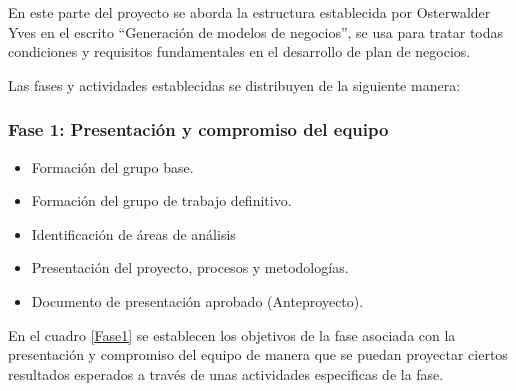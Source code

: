 En este parte del proyecto se aborda la estructura establecida por Osterwalder Yves en el escrito “Generación de modelos de negocios”\cite{modeloNegocio}, se usa para tratar todas condiciones y requisitos fundamentales en el desarrollo de plan de negocios. 

Las fases y actividades establecidas se distribuyen de la siguiente manera:
\subsubsection{Fase 1: Presentación y compromiso del equipo}


\begin{itemize}
    \item Formación del grupo base.
    \item Formación del grupo de trabajo definitivo.
    \item Identificación de áreas de análisis
    \item Presentación del proyecto, procesos y metodologías.
    \item Documento de presentación aprobado (Anteproyecto).
\end{itemize}

En el cuadro \ref{Fase1} se establecen los objetivos de la fase asociada con la presentación y compromiso del equipo de manera que se puedan proyectar ciertos resultados esperados a través de unas actividades especificas de la fase.

